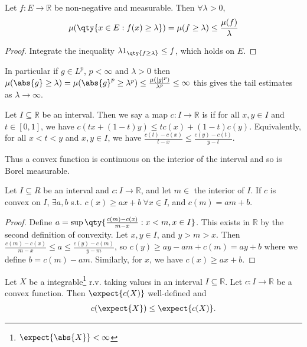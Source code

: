 \begin{proposition}
	Let $f \colon E \to \mathbb R$ be non-negative and measurable.
	Then $\forall \lambda > 0$,
	\[ \mu(\qty{x \in E : f(x) \geq \lambda}) = \mu(f \geq \lambda) \leq \frac{\mu(f)}{\lambda} \]
\end{proposition}

\begin{proof}
	Integrate the inequality $\lambda 1_{\qty{f \geq \lambda}} \leq f$, which holds on $E$.
\end{proof}

In particular if $g \in L^p$, $p < \infty$ and $\lambda > 0$ then $\mu(\abs{g} \geq \lambda) = \mu(\abs{g}^p \geq \lambda^p) \leq \frac{\mu(|g|^p)}{\lambda^p} \leq \infty$ this gives the tail estimates as $\lambda \to \infty$.

\begin{definition}
	Let $I \subseteq \mathbb{R}$ be an interval.
	Then we say a map $c \colon I \to \mathbb R$ is  if for all $x, y \in I$ and $t \in [0,1]$, we have $c(tx + (1-t)y) \leq tc(x) + (1-t)c(y)$.
	Equivalently, for all $x < t < y$ and $x, y \in I$, we have $\frac{c(t) - c(x)}{t-x} \leq \frac{c(y) - c(t)}{y-t}$.
\end{definition}

Thus a convex function is continuous on the interior of the interval and so is Borel measurable.

\begin{lemma}
	Let $I \subseteq R$ be an interval and $c : I \to \mathbb{R}$, and let $m \in$ the interior of $I$.
	If $c$ is convex on $I$, $\exists a, b$ s.t. $c(x) \geq ax + b \ \forall x \in I$, and $c(m) = am + b$.
\end{lemma}

\begin{proof}
	Define $a = \sup \qty{\frac{c(m) - c(x)}{m - x} : x < m, x \in I}$.
	This exists in $\mathbb R$ by the second definition of convexity.
	Let $x, y \in I$, and $y > m > x$.
	Then $\frac{c(m) - c(x)}{m - x} \leq a \leq \frac{c(y) - c(m)}{y - m}$, so $c(y) \geq ay - am + c(m) = ay + b$ where we define $b = c(m) - am$.
	Similarly, for $x$, we have $c(x) \geq ax + b$.
\end{proof}

\begin{theorem}
	Let $X$ be a integrable\footnote{$\expect{\abs{X}} < \infty$} r.v. taking values in an interval $I \subseteq \mathbb R$.
	Let $c \colon I \to \mathbb R$ be a convex function.
	Then $\expect{c(X)}$ well-defined and
	\begin{align*}
		c(\expect{X}) \leq \expect{c(X)}.
	\end{align*}
\end{theorem}

